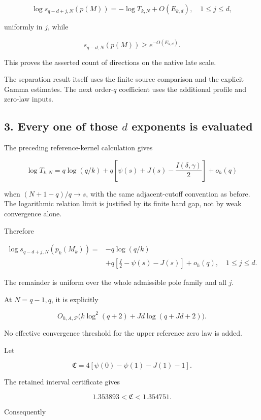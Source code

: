 \documentclass[11pt]{article}
\begin{document}
\[
\boxed{
\log s_{q-d+j,N}(p(M))
=-\log T_{k,N}+O(E_{k,d}),
\quad 1\le j\le d,
}
\tag{24}
\]

uniformly in \(j\), while

\[
\boxed{
s_{q-d,N}(p(M))\ge e^{-O(E_{k,d})}.
}
\tag{25}
\]

This proves the asserted count of directions on the native late scale.

The separation result itself uses the finite source comparison and the explicit Gamma estimates. The next order-\(q\) coefficient uses the additional profile and zero-law inputs.

\subsection{\texorpdfstring{3. Every one of those \(d\) exponents is evaluated}{3. Every one of those d exponents is evaluated}}\label{every-one-of-those-d-exponents-is-evaluated}

The preceding reference-kernel calculation gives

\[
\log T_{k,N}
=
q\log(q/k)
+q\left[\psi(s)+J(s)-\frac{I(\delta,\gamma)}2\right]
+o_h(q)
\tag{26}
\]

when \((N+1-q)/q\to s\), with the same adjacent-cutoff convention as before. The logarithmic relation limit is justified by its finite hard gap, not by weak convergence alone.

Therefore

\[
\boxed{
\begin{aligned}
\log s_{q-d+j,N}(p_k(M_k))
={}&-q\log(q/k)\\
&+q\left[\frac I2-\psi(s)-J(s)\right]+o_h(q),
\quad 1\le j\le d.
\end{aligned}
}
\tag{27}
\]

The remainder is uniform over the whole admissible pole family and all \(j\).

At \(N=q-1,q\), it is explicitly

\[
O_{h,A,\mathscr P}
\bigl(k\log^2(q+2)+Jd\log(q+Jd+2)\bigr).
\]

No effective convergence threshold for the upper reference zero law is added.

Let

\[
\mathfrak C
=4[\psi(0)-\psi(1)-J(1)-1].
\]

The retained interval certificate gives

\[
1.353893<\mathfrak C<1.354751.
\]

Consequently
\end{document}
